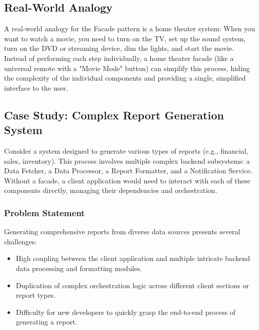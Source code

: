 \documentclass[12pt,a4paper]{article}
\begin{document}
\subsection{Real-World Analogy}
A real-world analogy for the Facade pattern is a home theater system: When you want to watch a movie, you need to turn on the TV, set up the sound system, turn on the DVD or streaming device, dim the lights, and start the movie. Instead of performing each step individually, a home theater facade (like a universal remote with a "Movie Mode" button) can simplify this process, hiding the complexity of the individual components and providing a single, simplified interface to the user.

\subsection{Case Study: Complex Report Generation System}
Consider a system designed to generate various types of reports (e.g., financial, sales, inventory). This process involves multiple complex backend subsystems: a Data Fetcher, a Data Processor, a Report Formatter, and a Notification Service. Without a facade, a client application would need to interact with each of these components directly, managing their dependencies and orchestration.

\subsubsection{Problem Statement}
Generating comprehensive reports from diverse data sources presents several challenges:
\begin{itemize}
    \item High coupling between the client application and multiple intricate backend data processing and formatting modules.
    \item Duplication of complex orchestration logic across different client sections or report types.
    \item Difficulty for new developers to quickly grasp the end-to-end process of generating a report.
\end{itemize}
\end{document}

